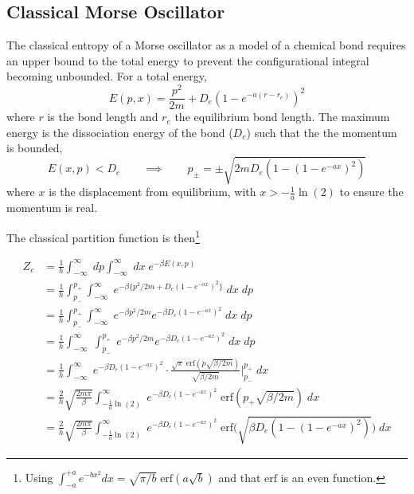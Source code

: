 \documentclass[../main.tex]{subfiles}
\begin{document}
\subsection{Classical Morse Oscillator}

The classical entropy of a Morse oscillator as a model of a chemical bond requires an upper bound to the total energy to prevent the configurational integral becoming unbounded. For a total energy,
\begin{equation}
	E(p, x) = \frac{p^2}{2m} + D_e (1 - e^{-a(r-r_e)})^2
\end{equation}
where $r$ is the bond length and $r_e$ the equilibrium bond length. The maximum energy is the dissociation energy of the bond ($D_e$) such that the the momentum is bounded,
\begin{equation}
	E(x, p) < D_e \qquad \implies \qquad p_\pm = \pm \sqrt{2mD_e(1 - (1-e^{-ax})^2)}
\end{equation}
where $x$ is the displacement from equilibrium, with $x > -\frac{1}{a}\ln(2)$ to ensure the momentum is real. 

The classical partition function is then\footnote{Using $\int_{-a}^{+a}  e^{-bx^2} dx = \sqrt{\pi/b}\;\text{erf}(a\sqrt{b})$ and that $\text{erf}$ is an even function.}

\begin{equation}
	\begin{aligned}
		Z_c &= \frac{1}{h}\int_{-\infty}^\infty \; dp\int_{-\infty}^{\infty} \; dx \; e^{-\beta E(x,p)} \\
		&= \frac{1}{h}\int_{p_-}^{p_+} \int_{-\infty}^{\infty}\; e^{-\beta \{{p^2}/{2m} + D_e (1 - e^{-ax})^2\}}  \; dx  \; dp \\
		&= \frac{1}{h}\int_{p_-}^{p_+} \int_{-\infty}^{\infty}\; e^{-\beta {p^2}/{2m}} e^{-\beta D_e (1 - e^{-ax})^2}  \; dx  \; dp \\
		&= \frac{1}{h} \int_{-\infty}^{\infty}\;\int_{p_-}^{p_+}\; e^{-\beta {p^2}/{2m}} e^{-\beta D_e (1 - e^{-ax})^2}  \; dx  \; dp \\
		&= \frac{1}{h} \int_{-\infty}^{\infty}\; e^{-\beta D_e (1 - e^{-ax})^2}  \cdot \frac{\sqrt{\pi}\;\text{erf}(p\sqrt{\beta/2m})}{\sqrt{\beta/2m}} \Bigg|_{p_-}^{p_+} \; dx \\
		&= \frac{2}{h}\sqrt{\frac{2m\pi}{\beta}} \int_{-\frac{1}{a}\ln(2)}^{\infty}\; e^{-\beta D_e (1 - e^{-ax})^2}   \;\text{erf}(p_+\sqrt{\beta/2m}) \; dx \\
		&= \frac{2}{h}\sqrt{\frac{2m\pi}{\beta}} \int_{-\frac{1}{a}\ln(2)}^{\infty}\; e^{-\beta D_e (1 - e^{-ax})^2}   \;\text{erf}{\Big (} \sqrt{\beta D_e(1 - (1-e^{-ax})^2)}{\Big )} \; dx 
	\end{aligned}
	\label{morse_pf_integral}
\end{equation}
\end{document}
